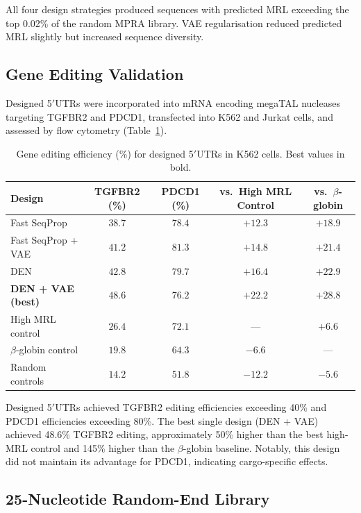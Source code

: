\documentclass[11pt]{article}
\begin{document}
All four design strategies produced sequences with predicted MRL exceeding the top 0.02\% of the random MPRA library. VAE regularisation reduced predicted MRL slightly but increased sequence diversity.

\subsection{Gene Editing Validation}

Designed 5$'$UTRs were incorporated into mRNA encoding megaTAL nucleases targeting TGFBR2 and PDCD1, transfected into K562 and Jurkat cells, and assessed by flow cytometry (Table~\ref{tab:editing}).

\begin{table}[H]
\centering
\caption{Gene editing efficiency (\%) for designed 5$'$UTRs in K562 cells. Best values in bold.}
\label{tab:editing}
\begin{tabular}{@{}lcccc@{}}
\toprule
Design & TGFBR2 (\%) & PDCD1 (\%) & vs.\ High MRL Control & vs.\ $\beta$-globin \\
\midrule
Fast SeqProp & $38.7$ & $78.4$ & $+12.3$ & $+18.9$ \\
Fast SeqProp + VAE & $41.2$ & $81.3$ & $+14.8$ & $+21.4$ \\
DEN & $42.8$ & $79.7$ & $+16.4$ & $+22.9$ \\
\textbf{DEN + VAE (best)} & $\mathbf{48.6}$ & $76.2$ & $\mathbf{+22.2}$ & $\mathbf{+28.8}$ \\
High MRL control & $26.4$ & $72.1$ & --- & $+6.6$ \\
$\beta$-globin control & $19.8$ & $64.3$ & $-6.6$ & --- \\
Random controls & $14.2$ & $51.8$ & $-12.2$ & $-5.6$ \\
\bottomrule
\end{tabular}
\end{table}

Designed 5$'$UTRs achieved TGFBR2 editing efficiencies exceeding 40\% and PDCD1 efficiencies exceeding 80\%. The best single design (DEN + VAE) achieved 48.6\% TGFBR2 editing, approximately 50\% higher than the best high-MRL control and 145\% higher than the $\beta$-globin baseline. Notably, this design did not maintain its advantage for PDCD1, indicating cargo-specific effects.

\subsection{25-Nucleotide Random-End Library}
\end{document}
